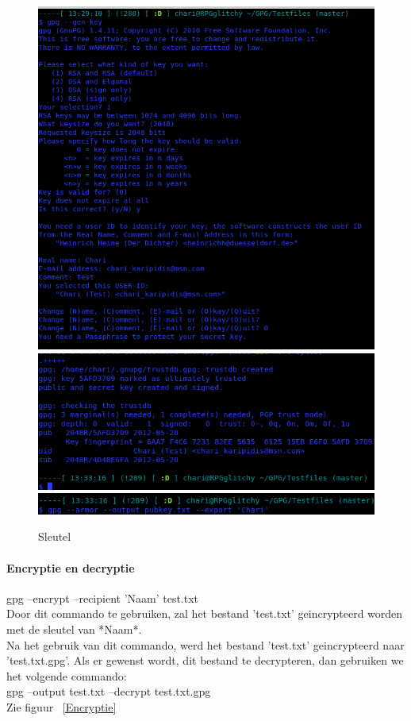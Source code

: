\documentclass[12pt]{article}
\begin{document}
				\begin{figure}
					\begin{center}
						\includegraphics[scale=0.4]{Pictures/Sleutel1}
						\includegraphics[scale=0.4]{Pictures/Sleutel2}
						\includegraphics[scale=0.4]{Pictures/Sleutel3}
					\end{center}
					\caption{Sleutel}\label{Terminal}
				\end{figure}
				
				\paragraph{Encryptie en decryptie}
				gpg --encrypt --recipient 'Naam' test.txt\\
				Door dit commando te gebruiken, zal het bestand 'test.txt' geincrypteerd worden
				met de sleutel van *Naam*.\\
				Na het gebruik van dit commando, werd het bestand 'test.txt' geincrypteerd naar
				'test.txt.gpg'.
				Als er gewenst wordt, dit bestand te decrypteren, dan gebruiken we het volgende 
				commando:\\
				gpg --output test.txt --decrypt test.txt.gpg\\
				Zie figuur ~\ref{Encryptie}\\
				
\end{document}
